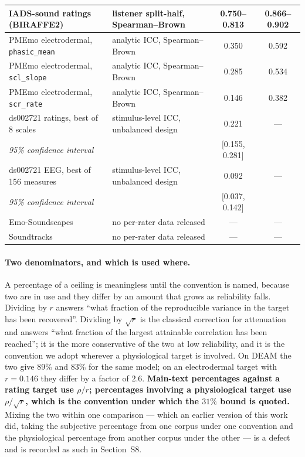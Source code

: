 \begin{table}[htbp]
\begin{tabular}{p{5.2cm}p{4.4cm}cc}
IADS-sound ratings (BIRAFFE2) & listener split-half, Spearman--Brown
  & 0.750--0.813 & 0.866--0.902 \\
\midrule
PMEmo electrodermal, \texttt{phasic\_mean} & analytic ICC, Spearman--Brown
  & 0.350 & 0.592 \\
PMEmo electrodermal, \texttt{scl\_slope} & analytic ICC, Spearman--Brown
  & 0.285 & 0.534 \\
PMEmo electrodermal, \texttt{scr\_rate} & analytic ICC, Spearman--Brown
  & 0.146 & 0.382 \\
\midrule
ds002721 ratings, best of 8 scales & stimulus-level ICC, unbalanced design
  & 0.221 & --- \\
\multicolumn{2}{l}{\quad \emph{95\% confidence interval}} & [0.155, 0.281] & \\
ds002721 EEG, best of 156 measures & stimulus-level ICC, unbalanced design
  & 0.092 & --- \\
\multicolumn{2}{l}{\quad \emph{95\% confidence interval}} & [0.037, 0.142] & \\
\midrule
Emo-Soundscapes & no per-rater data released & --- & --- \\
Soundtracks & no per-rater data released & --- & --- \\
\bottomrule
\end{tabular}
\end{table}

\paragraph{Two denominators, and which is used where.}
A percentage of a ceiling is meaningless until the convention is named, because two
are in use and they differ by an amount that grows as reliability falls. Dividing by
$r$ answers ``what fraction of the reproducible variance in the target has been
recovered''. Dividing by $\sqrt{r}$ is the classical correction for attenuation and
answers ``what fraction of the largest attainable correlation has been reached''; it
is the more conservative of the two at low reliability, and it is the convention we
adopt wherever a physiological target is involved. On DEAM the two give 89\% and 83\%
for the same model; on an electrodermal target with $r = 0.146$ they differ by a
factor of $2.6$. \textbf{Main-text percentages against a rating target use $\rho/r$;
percentages involving a physiological target use $\rho/\sqrt{r}$, which is the
convention under which the $31\%$ bound is quoted.} Mixing the two within one
comparison --- which an earlier version of this work did, taking the subjective
percentage from one corpus under one convention and the physiological percentage from
another corpus under the other --- is a defect and is recorded as such in
Section~S8.

